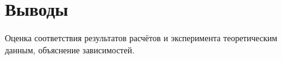 \section*{Выводы}

Оценка соответствия результатов расчётов и эксперимента теоретическим данным, объяснение зависимостей.